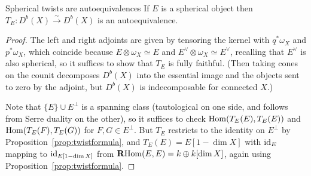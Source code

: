 \begin{proposition}{Spherical twists are autoequivalences}{}
    If $E$ is a spherical object then $T_E:D^b(X)\xrightarrow\sim D^b(X)$ is an
    autoequivalence.
\end{proposition}

\begin{proof}
    The left and right adjoints are given by tensoring the kernel with
    $q^*\omega_X$ and $p^*\omega_X$, which coincide because
    $E\otimes\omega_X\simeq E$ and $E^\vee\otimes\omega_X\simeq E^\vee$,
    recalling that $E^\vee$ is also spherical, so it suffices to show that
    $T_E$ is fully faithful. (Then taking cones on the counit decomposes
    $D^b(X)$ into the essential image and the objects sent to zero by the
    adjoint, but $D^b(X)$ is indecomposable for connected $X$.)

    Note that $\{E\}\cup E^\perp$ is a spanning class (tautological on one side,
    and follows from Serre duality on the other), so it suffices to check
    $\operatorname{Hom}(T_E(E),T_E(E))$ and $\operatorname{Hom}(T_E(F),T_E(G))$ for $F,G\in E^\perp$. But
    $T_E$ restricts to the identity on $E^\perp$ by
    Proposition~\ref{prop:twistformula}, and $T_E(E)=E[1-\dim X]$ with $\mathrm{id}_E$
    mapping to $\mathrm{id}_{E[1-\dim X]}$ from $\operatorname{\mathbf{R}Hom}(E,E)=k\oplus k[\dim X]$, again
    using Proposition~\ref{prop:twistformula}.
\end{proof}


